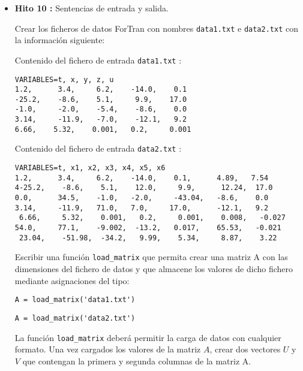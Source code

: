 \documentclass[12pt,spanish]{article}
\begin{document}
\begin{itemize}
\newpage 

\item {\bf Hito 10 :}   Sentencias de entrada y salida.

\vspace{0.5cm}    

Crear los ficheros de datos ForTran con nombres  \verb|data1.txt| e 
\verb|data2.txt| con la información siguiente:

\vspace{1cm}

Contenido del fichero de entrada \verb|data1.txt| :

\begin{verbatim}
VARIABLES=t, x, y, z, u
1.2,      3.4,     6.2,    -14.0,    0.1
-25.2,    -8.6,    5.1,     9.9,    17.0
-1.0,     -2.0,    -5.4,    -8.6,    0.0
3.14,     -11.9,   -7.0,    -12.1,   9.2
6.66,    5.32,    0.001,   0.2,     0.001
\end{verbatim}

\vspace{1cm}

Contenido del fichero de entrada \verb|data2.txt| :

\begin{verbatim}
VARIABLES=t, x1, x2, x3, x4, x5, x6
1.2,      3.4,     6.2,    -14.0,    0.1,      4.89,   7.54
4-25.2,    -8.6,    5.1,    12.0,     9.9,      12.24,  17.0
0.0,      34.5,    -1.0,   -2.0,     -43.04,   -8.6,    0.0
3.14,     -11.9,   71.0,   7.0,     17.0,      -12.1,   9.2
 6.66,     5.32,    0.001,   0.2,     0.001,    0.008,   -0.027
54.0,     77.1,    -9.002,  -13.2,   0.017,    65.53,   -0.021
 23.04,    -51.98,  -34.2,   9.99,    5.34,     8.87,    3.22 
\end{verbatim}

\vspace{0.5cm}


Escribir una función \verb|load_matrix| que permita crear una matriz A con las dimensiones 
del fichero de datos y que almacene los valores de dicho fichero mediante 
 asignaciones del tipo: 
 
 \hspace{2cm} \verb|A = load_matrix('data1.txt')| 
 
 \hspace{2cm}  \verb|A = load_matrix('data2.txt')|

La función   \verb|load_matrix| deberá permitir la carga de datos con cualquier formato. 
Una vez cargados los valores de la matriz $ A $, crear dos vectores $ U$ y $V$  que contengan la primera y segunda columnas de la matriz A. 
     

	
\end{itemize}
%
\end{document}
